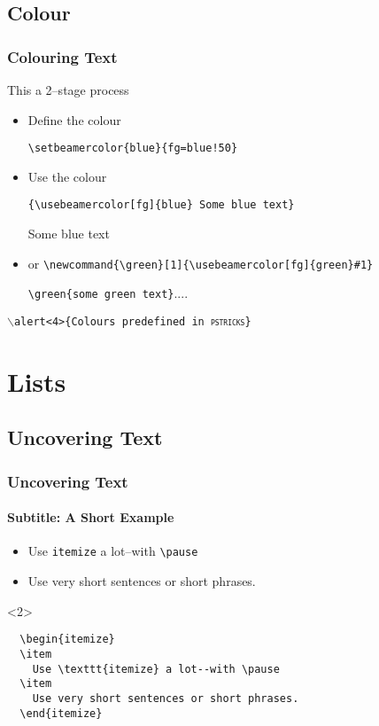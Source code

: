 \documentclass{beamer}
\newcommand{\bs}{\ensuremath{\backslash}}
\begin{document}
\subsection{Colour}

\begin{frame}[fragile]
  \frametitle{Colouring Text}
This a 2--stage process
\begin{itemize}
\item {\red Define} {\green the} {\blue colour}

\verb+\setbeamercolor{blue}{fg=blue!50}+\pause
\item Use the colour

\verb+{\usebeamercolor[fg]{blue} Some blue text}+

	{ Some blue text}
\pause
\item or
{\small\verb+\newcommand{\green}[1]{\usebeamercolor[fg]{green}#1}+}

\verb+\green{some green text}+....

\end{itemize}

\alert<4>{\texttt{\bs alert<4>\{Colours predefined in \textsc{pstricks}\}}}%
\end{frame}


\section{Lists}

\subsection{Uncovering Text}
\begin{frame}[fragile]
  \frametitle{Uncovering Text}
  \framesubtitle{Subtitle: A Short Example}

  \begin{itemize}
  \item
    Use \texttt{itemize} a lot--with \verb+\pause+\pause
  \item
    Use very short sentences or short phrases.
  \end{itemize}

  \begin{uncoverenv}<2>
  \begin{verbatim}
  \begin{itemize}
  \item
    Use \texttt{itemize} a lot--with \pause
  \item
    Use very short sentences or short phrases.
  \end{itemize}
  \end{verbatim}
  \end{uncoverenv}
\end{frame}
\end{document}

